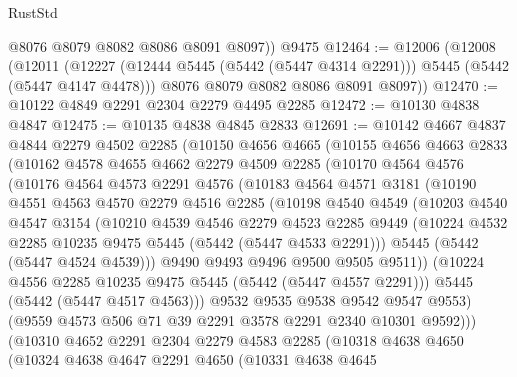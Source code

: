 \begin{lexlean}{RustStd}
\begin{coremodule}
{\begin{coremodule}
{{{{{{{{{{{{        @8076
        @8079
        @8082
        @8086
        @8091
        @8097))
    @9475
@12464 := @12006
    (@12008
      (@12011
        (@12227 (@12444 @5445 (@5442 (@5447 @4314 @2291))) @5445 (@5442 (@5447 @4147 @4478)))
        @8076
        @8079
        @8082
        @8086
        @8091
        @8097))
@12470 := @10122 @4849 @2291 @2304 @2279 @4495 @2285
@12472 := @10130 @4838 @4847
@12475 := @10135 @4838 @4845 @2833
@12691 := @10142
    @4667
    @4837
    @4844
    @2279
    @4502
    @2285
    (@10150
      @4656
      @4665
      (@10155
        @4656
        @4663
        @2833
        (@10162
          @4578
          @4655
          @4662
          @2279
          @4509
          @2285
          (@10170
            @4564
            @4576
            (@10176
              @4564
              @4573
              @2291
              @4576
              (@10183
                @4564
                @4571
                @3181
                (@10190
                  @4551
                  @4563
                  @4570
                  @2279
                  @4516
                  @2285
                  (@10198
                    @4540
                    @4549
                    (@10203
                      @4540
                      @4547
                      @3154
                      (@10210
                        @4539
                        @4546
                        @2279
                        @4523
                        @2285
                        @9449
                        (@10224 @4532 @2285 @10235 @9475 @5445 (@5442 (@5447 @4533 @2291)))
                        @5445
                        (@5442 (@5447 @4524 @4539)))
                      @9490
                      @9493
                      @9496
                      @9500
                      @9505
                      @9511))
                  (@10224 @4556 @2285 @10235 @9475 @5445 (@5442 (@5447 @4557 @2291)))
                  @5445
                  (@5442 (@5447 @4517 @4563)))
                @9532
                @9535
                @9538
                @9542
                @9547
                @9553)
              (@9559 @4573 @506 @71 @39 @2291 @3578 @2291 @2340 @10301 @9592)))
          (@10310
            @4652
            @2291
            @2304
            @2279
            @4583
            @2285
            (@10318
              @4638
              @4650
              (@10324
                @4638
                @4647
                @2291
                @4650
                (@10331
                  @4638
                  @4645
}}}}}}}}}}}}
\end{coremodule}}
\end{coremodule}
\end{lexlean}

